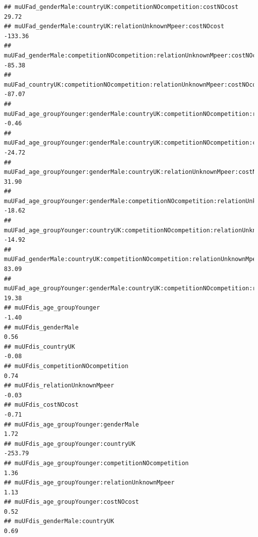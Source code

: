 \documentclass[
]{article}
\begin{document}
\begin{verbatim}
## muUFad_genderMale:countryUK:competitionNOcompetition:costNOcost                                           29.72
## muUFad_genderMale:countryUK:relationUnknownMpeer:costNOcost                                             -133.36
## muUFad_genderMale:competitionNOcompetition:relationUnknownMpeer:costNOcost                               -85.38
## muUFad_countryUK:competitionNOcompetition:relationUnknownMpeer:costNOcost                                -87.07
## muUFad_age_groupYounger:genderMale:countryUK:competitionNOcompetition:relationUnknownMpeer                -0.46
## muUFad_age_groupYounger:genderMale:countryUK:competitionNOcompetition:costNOcost                         -24.72
## muUFad_age_groupYounger:genderMale:countryUK:relationUnknownMpeer:costNOcost                              31.90
## muUFad_age_groupYounger:genderMale:competitionNOcompetition:relationUnknownMpeer:costNOcost              -18.62
## muUFad_age_groupYounger:countryUK:competitionNOcompetition:relationUnknownMpeer:costNOcost               -14.92
## muUFad_genderMale:countryUK:competitionNOcompetition:relationUnknownMpeer:costNOcost                      83.09
## muUFad_age_groupYounger:genderMale:countryUK:competitionNOcompetition:relationUnknownMpeer:costNOcost     19.38
## muUFdis_age_groupYounger                                                                                  -1.40
## muUFdis_genderMale                                                                                         0.56
## muUFdis_countryUK                                                                                         -0.08
## muUFdis_competitionNOcompetition                                                                           0.74
## muUFdis_relationUnknownMpeer                                                                              -0.03
## muUFdis_costNOcost                                                                                        -0.71
## muUFdis_age_groupYounger:genderMale                                                                        1.72
## muUFdis_age_groupYounger:countryUK                                                                      -253.79
## muUFdis_age_groupYounger:competitionNOcompetition                                                          1.36
## muUFdis_age_groupYounger:relationUnknownMpeer                                                              1.13
## muUFdis_age_groupYounger:costNOcost                                                                        0.52
## muUFdis_genderMale:countryUK                                                                               0.69

\end{verbatim}
\end{document}
